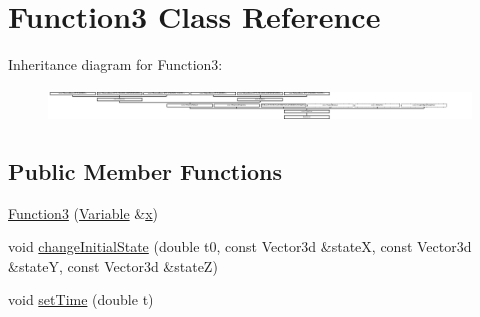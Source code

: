 \hypertarget{classFunction3}{}\section{Function3 Class Reference}
\label{classFunction3}
Inheritance diagram for Function3\+:\begin{figure}[H]
\begin{center}
\leavevmode
\includegraphics[height=0.901771cm]{d9/d4a/classFunction3}
\end{center}
\end{figure}
\subsection*{Public Member Functions}
\begin{DoxyCompactItemize}
\item 
\hyperlink{classFunction3_a57fce7c38791ee3c72951a4d0ac510e5}{Function3} (\hyperlink{classocra_1_1Variable}{Variable} \&\hyperlink{classocra_1_1Function_a28825886d1f149c87b112ec2ec1dd486}{x})
\item 
void \hyperlink{classFunction3_a239a319d61236aa9b9375a595bf2beb9}{change\+Initial\+State} (double t0, const Vector3d \&stateX, const Vector3d \&stateY, const Vector3d \&stateZ)
\item 
void \hyperlink{classFunction3_ade56597de44f5cdd047aa9aa9e29a129}{set\+Time} (double t)
\end{DoxyCompactItemize}
